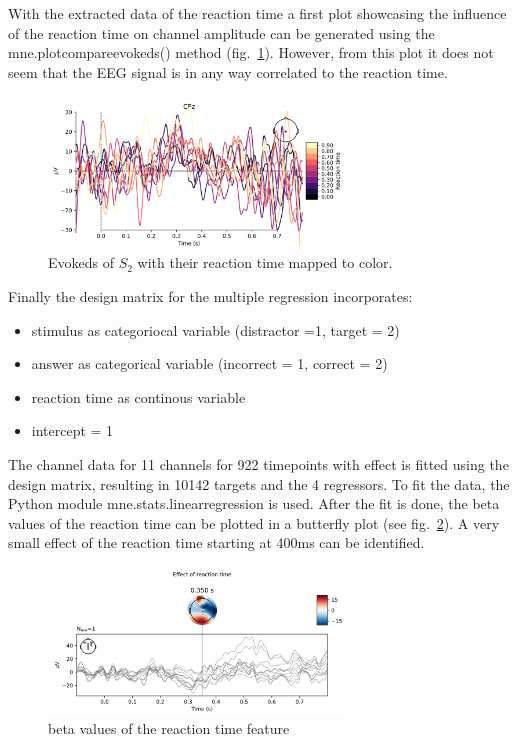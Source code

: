 \documentclass[a4paper]{article}
\begin{document}
\FloatBarrier
With the extracted data of the reaction time a first plot showcasing the influence of the reaction time on channel amplitude can be generated using the mne.plot\textunderscore compare\textunderscore evokeds() method (fig.~\ref{fig:mrReactionTimeEffect}).
However, from this plot it does not seem that the EEG signal is in any way correlated to the reaction time.

\begin{figure}[tbh!] 
  \centering
     \includegraphics[width=0.7\textwidth]{mrReactionTimeEffect.png}
  \caption{Evokeds of $S_2$ with their reaction time mapped to color.}
  \label{fig:mrReactionTimeEffect}
\end{figure}

Finally the design matrix for the multiple regression incorporates:
\begin{itemize}
\item stimulus as categoriocal variable (distractor =1, target = 2)
\item answer as categorical variable (incorrect = 1, correct = 2)
\item reaction time as continous variable
\item intercept = 1
\end{itemize}

The channel data for 11 channels for 922 timepoints with effect is fitted using the design matrix, resulting in 10142 targets and the 4 regressors.
To fit the data, the Python module mne.stats.linear\textunderscore regression is used.
After the fit is done, the beta values of the reaction time can be plotted in a butterfly plot (see fig.~\ref{fig:mrBetaRT}).
A very small effect of the reaction time starting at 400ms can be identified.

\begin{figure}[tbh!] 
  \centering
     \includegraphics[width=0.7\textwidth]{mrBetaRT.png}
  \caption{beta values of the reaction time feature}
  \label{fig:mrBetaRT}
\end{figure}
\end{document}
